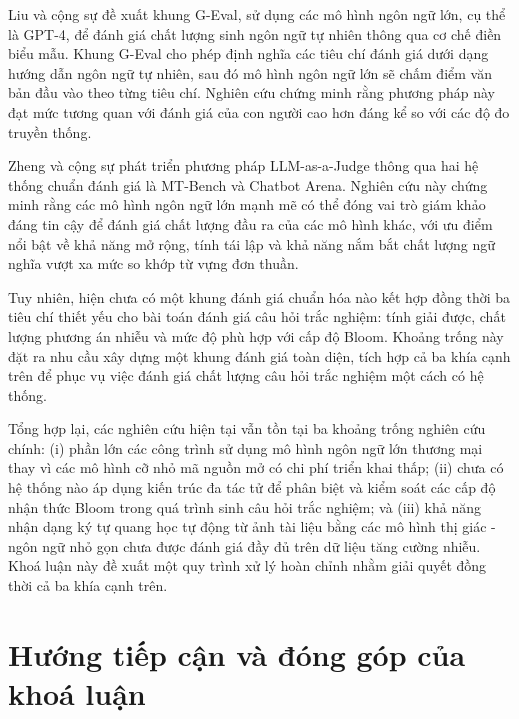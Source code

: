 Liu và cộng sự \cite{liu2023geval} đề xuất khung G-Eval, sử dụng các mô hình ngôn ngữ lớn, cụ thể là GPT-4, để đánh giá chất lượng sinh ngôn ngữ tự nhiên thông qua cơ chế điền biểu mẫu. Khung G-Eval cho phép định nghĩa các tiêu chí đánh giá dưới dạng hướng dẫn ngôn ngữ tự nhiên, sau đó mô hình ngôn ngữ lớn sẽ chấm điểm văn bản đầu vào theo từng tiêu chí. Nghiên cứu chứng minh rằng phương pháp này đạt mức tương quan với đánh giá của con người cao hơn đáng kể so với các độ đo truyền thống.

Zheng và cộng sự \cite{zheng2023judging} phát triển phương pháp LLM-as-a-Judge thông qua hai hệ thống chuẩn đánh giá là MT-Bench và Chatbot Arena. Nghiên cứu này chứng minh rằng các mô hình ngôn ngữ lớn mạnh mẽ có thể đóng vai trò giám khảo đáng tin cậy để đánh giá chất lượng đầu ra của các mô hình khác, với ưu điểm nổi bật về khả năng mở rộng, tính tái lập và khả năng nắm bắt chất lượng ngữ nghĩa vượt xa mức so khớp từ vựng đơn thuần.

Tuy nhiên, hiện chưa có một khung đánh giá chuẩn hóa nào kết hợp đồng thời ba tiêu chí thiết yếu cho bài toán đánh giá câu hỏi trắc nghiệm: tính giải được, chất lượng phương án nhiễu và mức độ phù hợp với cấp độ Bloom. Khoảng trống này đặt ra nhu cầu xây dựng một khung đánh giá toàn diện, tích hợp cả ba khía cạnh trên để phục vụ việc đánh giá chất lượng câu hỏi trắc nghiệm một cách có hệ thống.

\vspace{0.5em}

Tổng hợp lại, các nghiên cứu hiện tại vẫn tồn tại ba khoảng trống nghiên cứu chính: (i) phần lớn các công trình sử dụng mô hình ngôn ngữ lớn thương mại thay vì các mô hình cỡ nhỏ mã nguồn mở có chi phí triển khai thấp; (ii) chưa có hệ thống nào áp dụng kiến trúc đa tác tử để phân biệt và kiểm soát các cấp độ nhận thức Bloom trong quá trình sinh câu hỏi trắc nghiệm; và (iii) khả năng nhận dạng ký tự quang học tự động từ ảnh tài liệu bằng các mô hình thị giác - ngôn ngữ nhỏ gọn chưa được đánh giá đầy đủ trên dữ liệu tăng cường nhiễu. Khoá luận này đề xuất một quy trình xử lý hoàn chỉnh nhằm giải quyết đồng thời cả ba khía cạnh trên.

\section{Hướng tiếp cận và đóng góp của khoá luận}

